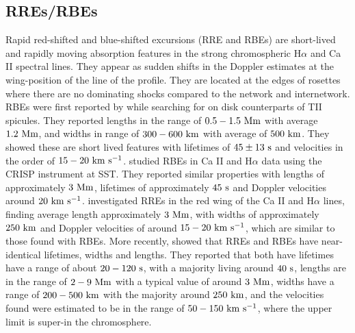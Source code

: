 \subsection{RREs/RBEs}
\label{subsec:rbe}
Rapid red-shifted and blue-shifted excursions (RRE and RBEs) are short-lived and rapidly moving absorption features in the strong chromospheric H$\alpha$ and Ca II spectral lines. They appear as sudden shifts in the Doppler estimates at the wing-position of the line of the profile. They are located at the edges of rosettes where there are no dominating shocks compared to the network and internetwork. RBEs were first reported by \cite{Langangen2008ApJ} while searching for on disk counterparts of TII spicules. They reported lengths in the range of $0.5-1.5~\rm{Mm}$ with average $1.2~\rm{Mm}$, and widths in range of $300-600~\rm{km}$ with average of $500~\rm{km}$. They showed these are short lived features with lifetimes of $45\pm13~\rm{s}$ and velocities in the order of $15-20~\rm{km ~s^{-1}}$. \cite{Rouppe2009ApJ} studied RBEs in Ca II and H$\alpha$ data using the CRISP instrument at SST. They reported similar properties with lengths of approximately $3~\rm{Mm}$, lifetimes of approximately $45~\rm{s}$ and Doppler velocities around $20~\rm{km ~s^{-1}}$. \cite{Sekse2013ApJ76944S,Sekse2013ApJ764164S} investigated RREs in the red wing of the  Ca II and H$\alpha$ lines, finding average length approximately $3~\rm{Mm}$, with widths of approximately $250~\rm{km}$ and Doppler velocities of around $15-20~\rm{km ~s^{-1}}$, which are similar to those found with RBEs.  More recently, \cite{Kuridze2015ApJ80226K} showed that RREs and RBEs have near-identical lifetimes, widths and lengths. They reported that both have lifetimes have a range of about $20-120~\rm{s}$, with a majority living around $40~\rm{s}$, lengths are in the range of $2-9~\rm{Mm}$ with a typical value of around $3~\rm{Mm}$, widths have a range of $200-500~\rm{km}$ with the majority around $250~\rm{km}$, and the velocities found were estimated to be in the range of $50-150~\rm{km ~s^{-1}}$, where the upper limit is super-\Alfvenic in the chromosphere. \np
%
